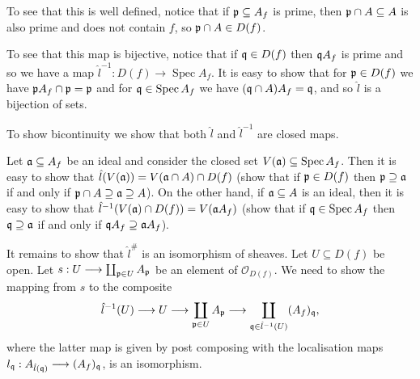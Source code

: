 \documentclass[12pt]{article}
\numberwithin{thm}{subsection}
\numberwithin{defn}{subsection}
\numberwithin{lemma}{subsection}
\numberwithin{example}{subsection}
\numberwithin{notation}{subsection}
\numberwithin{cor}{subsection}
\numberwithin{remark}{subsection}
\numberwithin{condition}{subsection}
\numberwithin{question}{subsection}
\numberwithin{construction}{subsection}
\numberwithin{construction}{subsection}
\numberwithin{construction}{subsection}
\newcommand{\lto}{\longrightarrow}
\begin{document}
To see that this is well defined, notice that if $\frak{p} \subseteq A_f$ is prime, then $\frak{p} \cap A \subseteq A$ is also prime and does not contain $f$, so $\frak{p} \cap A \in D(f)$.

To see that this map is bijective, notice that if $\frak{q} \in D(f)$ then $\frak{q}A_f$ is prime and so we have a map $\hat{l}^{-1}: D(f) \lto \operatorname{Spec}A_f$. It is easy to show that for $\frak{p} \in D(f)$ we have $\frak{p}A_f \cap \frak{p} = \frak{p}$ and for $\frak{q} \in \operatorname{Spec}A_f$ we have $(\frak{q} \cap A)A_f = \frak{q}$, and so $\hat{l}$ is a bijection of sets.

To show bicontinuity we show that both $\hat{l}$ and $\hat{l}^{-1}$ are closed maps.

Let $\frak{a} \subseteq A_f$ be an ideal and consider the closed set $V(\frak{a}) \subseteq \operatorname{Spec}A_f$. Then it is easy to show that $\hat{l}(V(\frak{a})) = V(\frak{a} \cap A) \cap D(f)$ (show that if $\frak{p} \in D(f)$ then $\frak{p} \supseteq \frak{a}$ if and only if $\frak{p} \cap A \supseteq \frak{a} \supseteq A$). On the other hand, if $\frak{a} \subseteq A$ is an ideal, then it is easy to show that $\hat{l}^{-1}(V(\frak{a}) \cap D(f)) = V(\frak{a}A_f)$ (show that if $\frak{q} \in \operatorname{Spec}A_f$ then $\frak{q} \supseteq \frak{a}$ if and only if $\frak{q}A_f \supseteq \frak{a}A_f$).

It remains to show that $\hat{l}^{\#}$ is an isomorphism of sheaves. Let $U \subseteq D(f)$ be open. Let $s: U \lto \coprod_{\frak{p} \in U}A_\frak{p}$ be an element of $\mathcal{O}_{D(f)}$. We need to show the mapping from $s$ to the composite
\begin{equation}
    \hat{l}^{-1}(U) \lto U \lto \coprod_{\frak{p} \in U}A_\frak{p} \lto \coprod_{\frak{q} \in \hat{l}^{-1}(U)}(A_f)_{\frak{q}},
\end{equation}
where the latter map is given by post composing with the localisation maps $l_{\frak{q}}: A_{\hat{l}(\frak{q})} \lto (A_f)_{\frak{q}}$, is an isomorphism.
\end{document}
